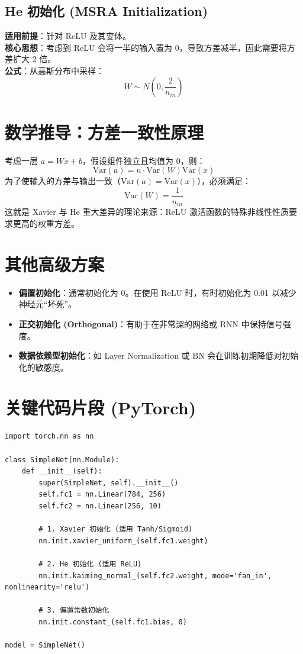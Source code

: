 \documentclass[12pt, a4paper]{article}
\begin{document}
\subsection{He 初始化 (MSRA Initialization)}
\textbf{适用前提}：针对 ReLU 及其变体。
\\ \textbf{核心思想}：考虑到 ReLU 会将一半的输入置为 0，导致方差减半，因此需要将方差扩大 2 倍。
\\ \textbf{公式}：从高斯分布中采样：
$$ W \sim N\left( 0, \frac{2}{n_{in}} \right) $$

\section{数学推导：方差一致性原理}
考虑一层 $a = Wx + b$，假设组件独立且均值为 0，则：
$$ \text{Var}(a) = n \cdot \text{Var}(W) \text{Var}(x) $$
为了使输入的方差与输出一致（$\text{Var}(a) = \text{Var}(x)$），必须满足：
$$ \text{Var}(W) = \frac{1}{n_{in}} $$
这就是 Xavier 与 He 重大差异的理论来源：ReLU 激活函数的特殊非线性性质要求更高的权重方差。

\section{其他高级方案}
\begin{itemize}
    \item \textbf{偏置初始化}：通常初始化为 0。在使用 ReLU 时，有时初始化为 0.01 以减少神经元“坏死”。
    \item \textbf{正交初始化 (Orthogonal)}：有助于在非常深的网络或 RNN 中保持信号强度。
    \item \textbf{数据依赖型初始化}：如 Layer Normalization 或 BN 会在训练初期降低对初始化的敏感度。
\end{itemize}

\section{关键代码片段 (PyTorch)}
\begin{lstlisting}
import torch.nn as nn

class SimpleNet(nn.Module):
    def __init__(self):
        super(SimpleNet, self).__init__()
        self.fc1 = nn.Linear(784, 256)
        self.fc2 = nn.Linear(256, 10)
        
        # 1. Xavier 初始化 (适用 Tanh/Sigmoid)
        nn.init.xavier_uniform_(self.fc1.weight)
        
        # 2. He 初始化 (适用 ReLU)
        nn.init.kaiming_normal_(self.fc2.weight, mode='fan_in', nonlinearity='relu')
        
        # 3. 偏置常数初始化
        nn.init.constant_(self.fc1.bias, 0)

model = SimpleNet()
\end{lstlisting}
\end{document}
